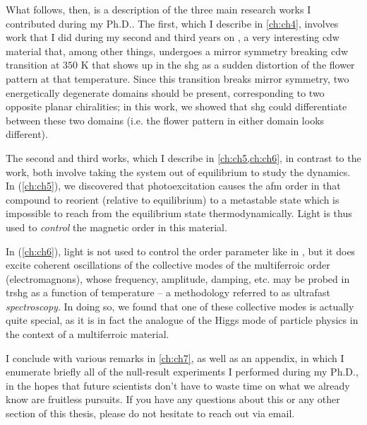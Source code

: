What follows, then, is a description of the three main research works I contributed during my Ph.D..
The first, which I describe in \cref{ch:ch4}, involves work that I did during my second and third years on \tastwo, a very interesting \gls{cdw} material that, among other things, undergoes a mirror symmetry breaking \gls{cdw} transition at $350$ \si{K} that shows up in the \gls{shg} as a sudden distortion of the flower pattern at that temperature.
Since this transition breaks mirror symmetry, two energetically degenerate domains should be present, corresponding to two opposite planar chiralities; in this work, we showed that \gls{shg} could differentiate between these two domains (i.e. the flower pattern in either domain looks different).

The second and third works, which I describe in \cref{ch:ch5,ch:ch6}, in contrast to the \tastwo work, both involve taking the system out of equilibrium to study the dynamics.
In  (\cref{ch:ch5}), we discovered that photoexcitation causes the \gls{afm} order in that compound to reorient (relative to equilibrium) to a metastable state which is impossible to reach from the equilibrium state thermodynamically.
Light is thus used to \textit{control} the magnetic order in this material.

In  (\cref{ch:ch6}), light is not used to control the order parameter like in , but it does excite coherent oscillations of the collective modes of the multiferroic order (electromagnons), whose frequency, amplitude, damping, etc. may be probed in \gls{trshg} as a function of temperature -- a methodology referred to as ultrafast \textit{spectroscopy}.
In doing so, we found that one of these collective modes is actually quite special, as it is in fact the analogue of the Higgs mode of particle physics in the context of a multiferroic material.

I conclude with various remarks in \cref{ch:ch7}, as well as an appendix, in which I enumerate briefly all of the null-result experiments I performed during my Ph.D., in the hopes that future scientists don't have to waste time on what we already know are fruitless pursuits.
If you have any questions about this or any other section of this thesis, please do not hesitate to reach out via email.

